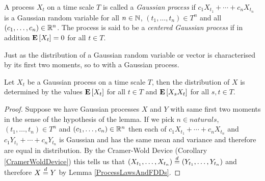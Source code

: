 \begin{defn}\label{defn:GaussianProcess}A process $X_t$ on a time scale $T$ is called a
  \emph{Gaussian process} if $c_1 X_{t_1} + \dotsb + c_n X_{t_n}$ is a
  Gaussian random variable for all $n \in \mathbb{N}$, $(t_1, \dotsc, t_n) \in T^n$ and
  all $(c_1, \dotsc, c_n) \in \mathbb{R}^n$.  The process is said to be a
  \emph{centered Gaussian process} if in addition $\textbf{E}\left[X_t\right] =
  0$ for all $t \in T$.
\end{defn}

Just as the distribution of a Gaussian random variable or vector is characterised by its
first two moments, so to with a Gaussian process.
\begin{lem}\label{GaussianProcessMoments}Let $X_t$ be a Gaussian process on a time scale $T$, then
  the distribution of $X$ is determined by the values
  $\textbf{E}\left[X_t\right]$ for all $t \in T$ and $\textbf{E}\left[X_s X_t\right]$
  for all $s,t \in T$.
\end{lem}
\begin{proof}
Suppose we have Gaussian processes $X$ and $Y$ with same first two
moments in the sense of the hypothesis of the lemma.  If we pick $n
\in naturals$, $(t_1, \dotsc, t_n) \in T^n$ and $(c_1, \dotsc, c_n)
\in \mathbb{R}^n$ then each of $c_1 X_{t_1} + \dotsb + c_n X_{t_n}$ and
$c_1 Y_{t_1} + \dotsb + c_n Y_{t_n}$ is Gaussian and has the same mean
and variance and therefore are equal in distribution.  By the
Cramer-Wold Device (Corollary \ref{CramerWoldDevice}) this tells us
that $(X_{t_1}, \dotsc , X_{t_n}) \overset{d}= (Y_{t_1}, \dotsc,Y_{t_n})$
and therefore $X \overset{d}= Y$ by Lemma \ref{ProcessLawsAndFDDs}.
\end{proof}

